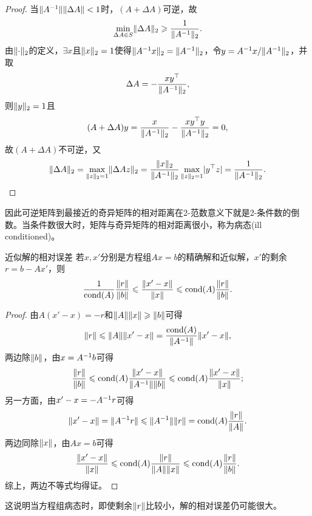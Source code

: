 \begin{proof}
    当$\lVert A^{-1}\rVert\lVert\Delta A\rVert < 1$时，$(A + \Delta A)$可逆，故
    \[
        \min_{\Delta A\in S}\lVert\Delta A\rVert_2 \geqslant \frac1{\lVert A^{-1}\rVert_2}.
    \]
    由$\lVert\cdot\rVert_2$的定义，$\exists x$且$\lVert x\rVert_2 = 1$使得$\lVert A^{-1} x\rVert_2 = \lVert A^{-1}\rVert_2$，令$y = A^{-1} x/\lVert A^{-1}\rVert_2$，并取
    \[
        \Delta A = -\frac{xy^\top}{\lVert A^{-1}\rVert_2},
    \]
    则$\lVert y\rVert_2 = 1$且
    \[
        (A + \Delta A)y = \frac{x}{\lVert A^{-1}\rVert_2} - \frac{xy^\top y}{\lVert A^{-1}\rVert_2} = 0,
    \]
    故$(A + \Delta A)$不可逆，又
    \[
        \lVert\Delta A\rVert_2 = \max_{\lVert z\rVert_2=1}\lVert\Delta Az\rVert_2 = \frac{\lVert x\rVert_2}{\lVert A^{-1}\rVert_2}\max_{\lVert z\rVert_2=1}\lvert y^\top z\rvert = \frac1{\lVert A^{-1}\rVert_2}.
        \qedhere
    \]
\end{proof}

\begin{remark}
    因此可逆矩阵到最接近的奇异矩阵的相对距离在2-范数意义下就是2-条件数的倒数。当条件数很大时，矩阵与奇异矩阵的相对距离很小，称为病态(ill conditioned)。
\end{remark}

\begin{theorem}
    {近似解的相对误差}{}
    若$x,x'$分别是方程组$Ax = b$的精确解和近似解，$x'$的剩余$r = b - Ax'$，则
    \begin{equation}
        \frac1{\operatorname{cond}(A)}\frac{\lVert r\rVert}{\lVert b\rVert} \leqslant \frac{\lVert x' - x\rVert}{\lVert x\rVert} \leqslant \operatorname{cond}(A)\frac{\lVert r\rVert}{\lVert b\rVert}.
    \end{equation}
\end{theorem}

\begin{proof}
    由$A(x' - x) = -r$和$\lVert A\rVert\lVert x\rVert \geqslant \lVert b\rVert$可得
    \[
        \lVert r\rVert \leqslant \lVert A\rVert\lVert x' - x\rVert = \frac{\operatorname{cond}(A)}{\lVert A^{-1}\rVert}\lVert x' - x\rVert,
    \]
    两边除$\lVert b\rVert$，由$x = A^{-1} b$可得
    \[
        \frac{\lVert r\rVert}{\lVert b\rVert} \leqslant \operatorname{cond}(A)\frac{\lVert x' - x\rVert}{\lVert A^{-1}\rVert\lVert b\rVert} \leqslant \operatorname{cond}(A)\frac{\lVert x' - x\rVert}{\lVert x\rVert};
    \]
    另一方面，由$x' - x = -A^{-1} r$可得
    \[
        \lVert x' - x\rVert = \lVert A^{-1} r\rVert \leqslant \lVert A^{-1}\rVert\lVert r\rVert = \operatorname{cond}(A)\frac{\lVert r\rVert}{\lVert A\rVert}.
    \]
    两边同除$\lVert x\rVert$，由$Ax = b$可得
    \[
        \frac{\lVert x' - x\rVert}{\lVert x\rVert} \leqslant \operatorname{cond}(A)\frac{\lVert r\rVert}{\lVert A\rVert\lVert x\rVert} \leqslant \operatorname{cond}(A)\frac{\lVert r\rVert}{\lVert b\rVert}.
    \]
    综上，两边不等式均得证。
\end{proof}

\begin{remark}
    这说明当方程组病态时，即使剩余$\lVert r\rVert$比较小，解的相对误差仍可能很大。
\end{remark}

